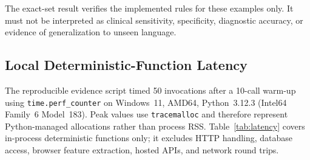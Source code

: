 \documentclass[10pt, conference, letterpaper]{IEEEtran}
\begin{document}
\begin{table}[!t]
\caption{Constructed Crisis-Language Rule Verification}
\label{tab:negation}
\centering
{}
\end{table}

The exact-set result verifies the implemented rules for these examples only.
It must not be interpreted as clinical sensitivity, specificity, diagnostic
accuracy, or evidence of generalization to unseen language.
\subsection{Local Deterministic-Function Latency}
\label{sec:latency}

The reproducible evidence script timed 50 invocations after a 10-call warm-up
using \texttt{time.perf\_counter} on Windows~11, AMD64, Python~3.12.3
(Intel64 Family~6 Model~183). Peak values use \texttt{tracemalloc} and therefore
represent Python-managed allocations rather than process RSS. Table~\ref{tab:latency}
covers in-process deterministic functions only; it excludes HTTP handling,
database access, browser feature extraction, hosted APIs, and network round trips.

\begin{table}[!t]
\caption{Local Deterministic-Function Microbenchmark}
\label{tab:latency}
\centering
{}
\end{table}
\end{document}
